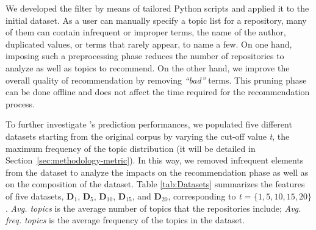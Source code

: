 We developed the filter by means of tailored Python scripts and applied it to the initial dataset. As a \GH user can manually specify a topic list for a repository, many of them can contain infrequent or improper terms, \ie the name of the author, duplicated values, or terms that rarely appear, to name a few. On one hand, imposing such a preprocessing phase reduces the number of repositories to analyze as well as topics to recommend. On the other hand, we improve the overall quality of recommendation by removing \emph{``bad''} terms. This pruning phase can be done offline and does not affect the time required for the recommendation process.

To further investigate \TF's prediction performances, we populated five different datasets starting from the original corpus by varying the cut-off value \emph{t}, \ie the maximum frequency of the topic distribution (it will be detailed in Section~\ref{sec:methodology-metric}). In this way, we removed infrequent elements from the dataset to analyze the impacts on the recommendation phase as well as on the composition of the dataset. Table \ref{tab:Datasets} summarizes the features of five datasets, \ie \textbf{D$_1$}, \textbf{D$_5$}, \textbf{D$_{10}$}, \textbf{D$_{15}$}, and \textbf{D$_{20}$}, corresponding to \emph{t} = $\{1, 5, 10, 15, 20\}$. \emph{Avg. topics} is the average number of topics that the repositories include; \emph{Avg. freq. topics} is the average frequency of the topics in the dataset.%


%


